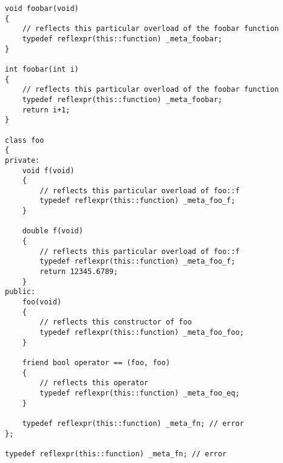 \begin{verbatim}
void foobar(void)
{
	// reflects this particular overload of the foobar function
	typedef reflexpr(this::function) _meta_foobar;
}

int foobar(int i)
{
	// reflects this particular overload of the foobar function
	typedef reflexpr(this::function) _meta_foobar;
	return i+1;
}

class foo
{
private:
	void f(void)
	{
		// reflects this particular overload of foo::f
		typedef reflexpr(this::function) _meta_foo_f;
	}

	double f(void)
	{
		// reflects this particular overload of foo::f
		typedef reflexpr(this::function) _meta_foo_f;
		return 12345.6789;
	}
public:
	foo(void)
	{
		// reflects this constructor of foo
		typedef reflexpr(this::function) _meta_foo_foo;
	}

	friend bool operator == (foo, foo)
	{
		// reflects this operator
		typedef reflexpr(this::function) _meta_foo_eq;
	}

	typedef reflexpr(this::function) _meta_fn; // error
};

typedef reflexpr(this::function) _meta_fn; // error
\end{verbatim}
